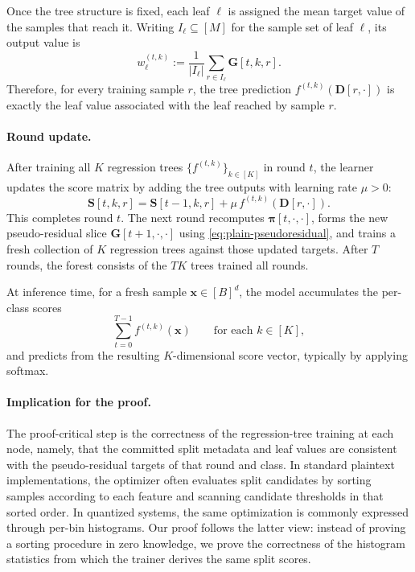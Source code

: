 Once the tree structure is fixed, each leaf $\ell$ is assigned the mean target
value of the samples that reach it. Writing $I_\ell\subseteq[M]$ for the sample
set of leaf $\ell$, its output value is
\begin{equation}\label{eq:plain-leaf-value}
w_{\ell}^{(t,k)}
:=
\frac{1}{|I_\ell|}\sum_{r\in I_\ell} \mathbf{G}[t,k,r].
\end{equation}
Therefore, for every training sample $r$, the tree prediction
$f^{(t,k)}(\mathbf{D}[r,\cdot])$ is exactly the leaf value associated with the
leaf reached by sample $r$.

\paragraph{Round update.}
After training all $K$ regression trees
$\{f^{(t,k)}\}_{k\in[K]}$ in round $t$, the learner updates the score matrix by
adding the tree outputs with learning rate $\mu>0$:
\begin{equation}\label{eq:plain-score-update}
\mathbf{S}[t,k,r]
=
\mathbf{S}[t-1,k,r] + \mu\, f^{(t,k)}(\mathbf{D}[r,\cdot]).
\end{equation}
This completes round $t$. The next round recomputes
$\boldsymbol{\pi}[t,\cdot,\cdot]$, forms the new pseudo-residual slice
$\mathbf{G}[t+1,\cdot,\cdot]$ using \eqref{eq:plain-pseudoresidual}, and trains a fresh
collection of $K$ regression trees against those updated targets. After $T$
rounds, the forest consists of the $TK$ trees trained all rounds.

At inference time, for a fresh sample $\mathbf{x}\in[B]^d$, the model
accumulates the per-class scores
\[
\sum_{t=0}^{T-1} f^{(t,k)}(\mathbf{x})
\qquad\text{for each }k\in[K],
\]
and predicts from the resulting $K$-dimensional score vector, typically by
applying softmax.

\paragraph{Implication for the proof.}
The proof-critical step is the correctness of the regression-tree training at
each node, namely, that the committed split metadata and leaf values are
consistent with the pseudo-residual targets of that round and class. In
standard plaintext implementations, the optimizer often evaluates split
candidates by sorting samples according to each feature and scanning candidate
thresholds in that sorted order. In quantized systems, the same optimization is
commonly expressed through per-bin histograms. Our proof follows the latter
view: instead of proving a sorting procedure in zero knowledge, we prove the
correctness of the histogram statistics from which the trainer derives the same
split scores.


